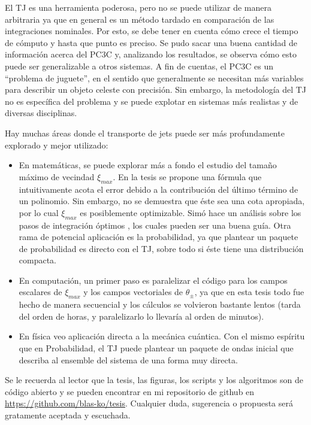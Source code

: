El TJ es una herramienta poderosa, pero no se puede utilizar de manera arbitraria ya que en general es un método tardado en comparación de las integraciones nominales. Por esto, se debe tener en cuenta cómo crece el tiempo de cómputo y hasta que punto es preciso. Se pudo sacar una buena cantidad de información acerca del PC3C y, analizando los resultados, se observa cómo esto puede ser generalizable a otros sistemas. A fin de cuentas, el PC3C es un ``problema de juguete'', en el sentido que generalmente se necesitan más variables para describir un objeto celeste con precisión. Sin embargo, la metodología del TJ no es específica del problema y se puede explotar en sistemas más realistas y de diversas disciplinas. 

Hay muchas áreas donde el transporte de jets puede ser más profundamente explorado y mejor utilizado: 
\begin{itemize}
\item En matemáticas, se puede explorar más a fondo el estudio del tamaño máximo de vecindad $\xi_{max}$. En la tesis se propone una fórmula que intuitivamente acota el error debido a la contribución del último término de un polinomio. Sin embargo, no se demuestra que éste sea una cota apropiada, por lo cual $\xi_{max}$ es posiblemente optimizable. Simó hace un análisis sobre los pasos de integración óptimos \cite[Capítulo~15]{Simo2001}, los cuales pueden ser una buena guía. Otra rama de potencial aplicación es la probabilidad, ya que plantear un paquete de probabilidad es directo con el TJ, sobre todo si éste tiene una distribución compacta.

\item En computación, un primer paso es paralelizar el código para los campos escalares de $\xi_{max}$ y los campos vectoriales de $\theta_{\pm}$, ya que en esta tesis todo fue hecho de manera secuencial y los cálculos se volvieron bastante lentos (tarda del orden de horas, y paralelizarlo lo llevaría al orden de minutos). 

\item En física veo aplicación directa a la mecánica cuántica. Con el mismo espíritu que en Probabilidad, el TJ puede plantear un paquete de ondas inicial que describa al ensemble del sistema de una forma muy directa. 
\end{itemize}

Se le recuerda al lector que la tesis, las figuras, los scripts y los algoritmos son de código abierto y se pueden encontrar en mi repositorio de github en \href{https://github.com/blas-ko/tesis}{https://github.com/blas-ko/tesis}. Cualquier duda, sugerencia o propuesta será gratamente aceptada y escuchada.

